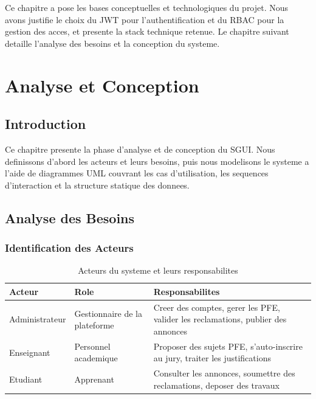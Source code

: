 \documentclass[12pt,a4paper]{report}
\begin{document}
Ce chapitre a pose les bases conceptuelles et technologiques du projet.
Nous avons justifie le choix du JWT pour l'authentification et du RBAC
pour la gestion des acces, et presente la stack technique retenue. Le
chapitre suivant detaille l'analyse des besoins et la conception du
systeme.

\chapter{Analyse et Conception}

\section{Introduction}

Ce chapitre presente la phase d'analyse et de conception du SGUI. Nous
definissons d'abord les acteurs et leurs besoins, puis nous modelisons
le systeme a l'aide de diagrammes UML couvrant les cas d'utilisation,
les sequences d'interaction et la structure statique des donnees.

\section{Analyse des Besoins}

\subsection{Identification des Acteurs}

\begin{table}[H]
\centering
\caption{Acteurs du systeme et leurs responsabilites}
\begin{tabular}{lp{4cm}p{6cm}}
\toprule
\textbf{Acteur} & \textbf{Role} & \textbf{Responsabilites} \\
\midrule
Administrateur & Gestionnaire de la plateforme &
  Creer des comptes, gerer les PFE, valider les reclamations,
  publier des annonces \\
\addlinespace
Enseignant & Personnel academique &
  Proposer des sujets PFE, s'auto-inscrire au jury, traiter les
  justifications \\
\addlinespace
Etudiant & Apprenant &
  Consulter les annonces, soumettre des reclamations, deposer des
  travaux \\
\bottomrule
\end{tabular}
\end{table}
\end{document}
